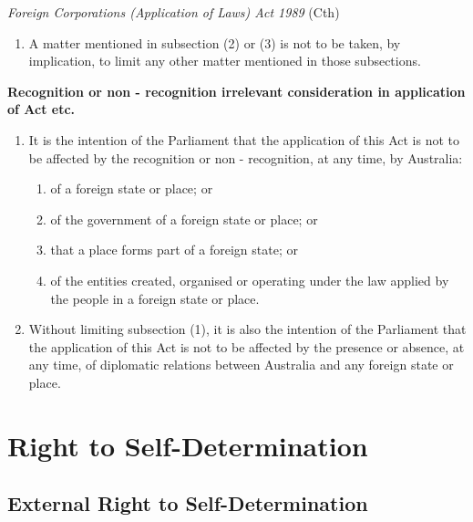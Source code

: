 \begin{statutedetails}{\textit{Foreign Corporations (Application of Laws) Act 1989} (Cth)}
\begin{enumerate}[label=(\arabic*)]
\begin{enumerate}[label=(\alph*)]
            \item the existence, nature or extent of any other interest in a foreign corporation; or
            \item the internal management and proceedings of a foreign corporation; or
            \item the validity of a foreign corporation's dealings otherwise than with outsiders;
        \end{enumerate}
        \item A matter mentioned in subsection (2) or (3) is not to be taken, by implication, to limit any other matter mentioned in those subsections.
    \end{enumerate}

    \textbf{Recognition or non - recognition irrelevant consideration in application of Act etc.}
    \begin{enumerate}[label=(\arabic*)]
        \item It is the intention of the Parliament that the application of this Act is not to be affected by the recognition or non - recognition, at any time, by Australia:
        \begin{enumerate}[label=(\alph*)]
            \item of a foreign state or place; or
            \item of the government of a foreign state or place; or
            \item that a place forms part of a foreign state; or
            \item of the entities created, organised or operating under the law applied by the people in a foreign state or place.           
        \end{enumerate}
        \item Without limiting subsection (1), it is also the intention of the Parliament that the application of this Act is not to be affected by the presence or absence, at any time, of diplomatic relations between Australia and any foreign state or place.
    \end{enumerate}
\end{statutedetails}

\section{Right to Self-Determination}

\subsection{External Right to Self-Determination}